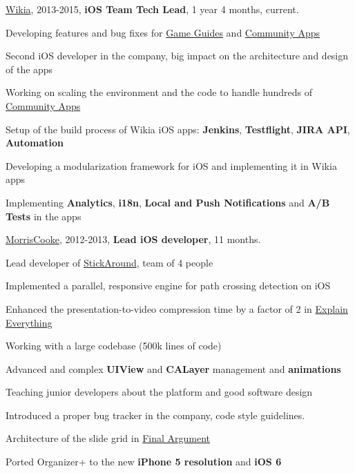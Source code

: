\documentclass[letterpaper]{article}
\renewenvironment{itemize}{
  \begin{list}{}{
    \setlength{\leftmargin}{1.5em}
  }
}{
  \end{list}
}
\begin{document}
\begin{itemize}
    \item \href{http://www.wikia.com}{Wikia}, 2013-2015, {\bf iOS Team Tech Lead}, 1 year 4 months, current.
        \begin{itemize}
            \item Developing features and bug fixes for \href{https://itunes.apple.com/us/app/wikia-game-guides-walkthroughs/id422467074?mt=8}{Game Guides} and \href{https://itunes.apple.com/us/artist/wikia-inc./id422467077}{Community Apps}
            \item Second iOS developer in the company, big impact on the architecture and design of the apps
            \item Working on scaling the environment and the code to handle hundreds of \href{https://itunes.apple.com/us/artist/wikia-inc./id422467077}{Community Apps}
            \item Setup of the build process of Wikia iOS apps: {\bf Jenkins}, {\bf Testflight}, {\bf JIRA API}, {\bf Automation}
            \item Developing a modularization framework for iOS and implementing it in Wikia apps
            \item Implementing {\bf Analytics}, {\bf i18n}, {\bf Local and Push Notifications} and {\bf A/B Tests} in the apps
        \end{itemize}
    \item \href{http://www.morriscooke.com}{MorrisCooke}, 2012-2013, {\bf Lead iOS developer}, 11 months.
		\begin{itemize}
            \item Lead developer of \href{https://itunes.apple.com/us/app/stick-around-by-tony-vincent/id557949353?mt=8}{StickAround}, team of 4 people
            \item Implemented a parallel, responsive engine for path crossing detection on iOS
            \item Enhanced the presentation-to-video compression time by a factor of 2 in \href{https://itunes.apple.com/us/app/explain-everything/id431493086?mt=8}{Explain Everything}
            \item Working with a large codebase (500k lines of code)
            \item Advanced and complex {\bf UIView} and {\bf CALayer} management and {\bf animations}
            \item Teaching junior developers about the platform and good software design
            \item Introduced a proper bug tracker in the company, code style guidelines.
            \item Architecture of the slide grid in \href{https://itunes.apple.com/us/app/final-argument/id480232096?mt=8}{Final Argument}
            \item Ported Organizer+ to the new {\bf iPhone 5 resolution} and {\bf iOS 6}
		\end{itemize}


\end{itemize}
\end{document}
